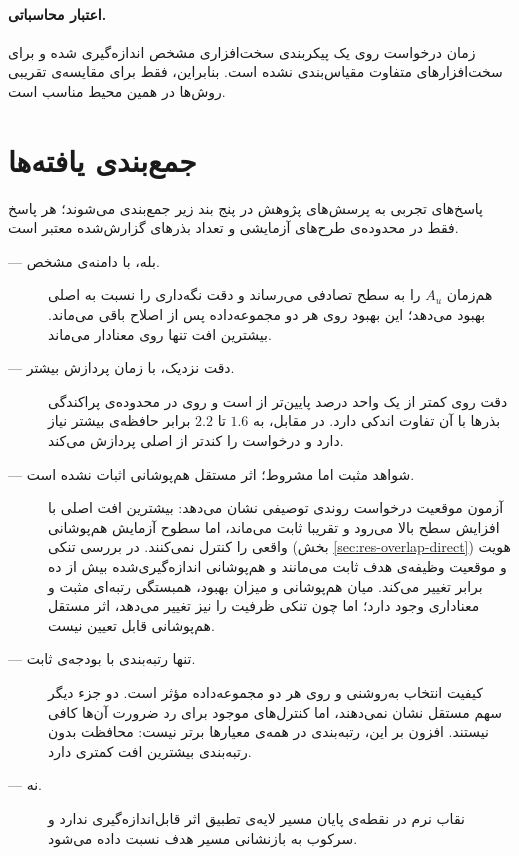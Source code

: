 \paragraph{اعتبار محاسباتی.} زمان درخواست روی یک پیکربندی سخت‌افزاری مشخص اندازه‌گیری شده و برای سخت‌افزارهای متفاوت مقیاس‌بندی نشده است. بنابراین، فقط برای مقایسه‌ی تقریبی روش‌ها در همین محیط مناسب است.

\section{جمع‌بندی یافته‌ها}
\label{sec:res-summary}

پاسخ‌های تجربی به پرسش‌های پژوهش در پنج بند زیر جمع‌بندی می‌شوند؛ هر پاسخ فقط در محدوده‌ی طرح‌های آزمایشی و تعداد بذرهای گزارش‌شده معتبر است.

\begin{description}
	\item[ — بله، با دامنه‌ی مشخص.]  هم‌زمان $A_u$ را به سطح تصادفی می‌رساند و دقت نگه‌داری را نسبت به  اصلی بهبود می‌دهد؛ این بهبود روی هر دو مجموعه‌داده پس از اصلاح  باقی می‌ماند. بیشترین افت تنها روی  معنادار می‌ماند.
	\item[ — دقت نزدیک، با زمان پردازش بیشتر.] دقت  روی  کمتر از یک واحد درصد پایین‌تر از  است و روی  در محدوده‌ی پراکندگی بذرها با آن تفاوت اندکی دارد. در مقابل،  به $1.6$ تا $2.2$ برابر حافظه‌ی بیشتر نیاز دارد و  درخواست را کندتر از  اصلی پردازش می‌کند.
	\item[ — شواهد مثبت اما مشروط؛ اثر مستقل هم‌پوشانی اثبات نشده است.] آزمون موقعیت درخواست روندی توصیفی نشان می‌دهد: بیشترین افت  اصلی با افزایش سطح بالا می‌رود و  تقریبا ثابت می‌ماند، اما سطوح آزمایش هم‌پوشانی واقعی را کنترل نمی‌کنند. در بررسی تنکی (بخش \ref{sec:res-overlap-direct}) هویت و موقعیت وظیفه‌ی هدف ثابت می‌مانند و هم‌پوشانی اندازه‌گیری‌شده بیش از ده برابر تغییر می‌کند. میان هم‌پوشانی و میزان بهبود، همبستگی رتبه‌ای مثبت و معناداری وجود دارد؛ اما چون تنکی ظرفیت را نیز تغییر می‌دهد، اثر مستقل هم‌پوشانی قابل تعیین نیست.
	\item[ — تنها رتبه‌بندی با بودجه‌ی ثابت.] کیفیت انتخاب به‌روشنی و روی هر دو مجموعه‌داده مؤثر است. دو جزء دیگر سهم مستقل نشان نمی‌دهند، اما کنترل‌های موجود برای رد ضرورت آن‌ها کافی نیستند. افزون بر این، رتبه‌بندی در همه‌ی معیارها برتر نیست: محافظت بدون رتبه‌بندی بیشترین افت کمتری دارد.
	\item[ — نه.] نقاب نرم در نقطه‌ی پایان مسیر لایه‌ی تطبیق اثر قابل‌اندازه‌گیری ندارد و سرکوب به بازنشانی مسیر هدف نسبت داده می‌شود.
\end{description}
